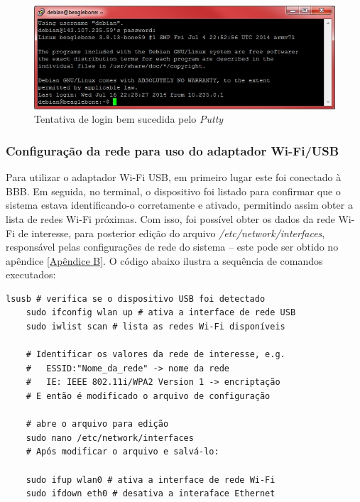 \begin{figure}[H]
	\centering
	\includegraphics[scale=0.80]{./Resources/putty-first-login.jpg}
	\captionsetup{justification=centering}
	\caption[Tentativa de login bem sucedida pelo \textit{Putty}]{Tentativa de login bem sucedida pelo \textit{Putty}}
	\label{putty-flogin}
\end{figure}

\subsubsection{Configuração da rede para uso do adaptador Wi-Fi/USB}

Para utilizar o adaptador Wi-Fi USB, em primeiro lugar este foi conectado à BBB. Em seguida, no terminal, o dispositivo foi listado para confirmar que o sistema estava identificando-o corretamente e ativado, permitindo assim obter a lista de redes Wi-Fi próximas. Com isso, foi possível obter os dados da rede Wi-Fi de interesse, para posterior edição do arquivo \textit{/etc/network/interfaces}, responsável pelas configurações de rede do sistema -- este pode ser obtido no apêndice \ref{Apêndice B}. O código abaixo ilustra a sequência de comandos executados:

\lstset{language=bash}
\begin{lstlisting}[frame=single, basicstyle=\linespread{0.85}\ttfamily]
	lsusb # verifica se o dispositivo USB foi detectado
	sudo ifconfig wlan up # ativa a interface de rede USB
	sudo iwlist scan # lista as redes Wi-Fi disponíveis
	
	# Identificar os valores da rede de interesse, e.g.
	#	ESSID:"Nome_da_rede" -> nome da rede
	#	IE: IEEE 802.11i/WPA2 Version 1 -> encriptação
	# E então é modificado o arquivo de configuração
	
	# abre o arquivo para edição
	sudo nano /etc/network/interfaces 
	# Após modificar o arquivo e salvá-lo:
	
	sudo ifup wlan0 # ativa a interface de rede Wi-Fi
	sudo ifdown eth0 # desativa a interaface Ethernet

\end{lstlisting}

